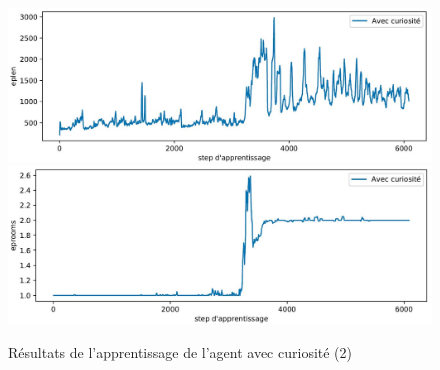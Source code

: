 \documentclass[a4paper,12pt]{report}
\begin{document}
\begin{figure}[H]
    \centering
    \includegraphics[width=\textwidth]{curiosity_only/curiosity_eplen.JPG}\\
    \includegraphics[width=\textwidth]{curiosity_only/curiosity_eprooms.JPG}
    \caption{Résultats de l'apprentissage de l'agent avec curiosité (2)}
\end{figure}
\end{document}
